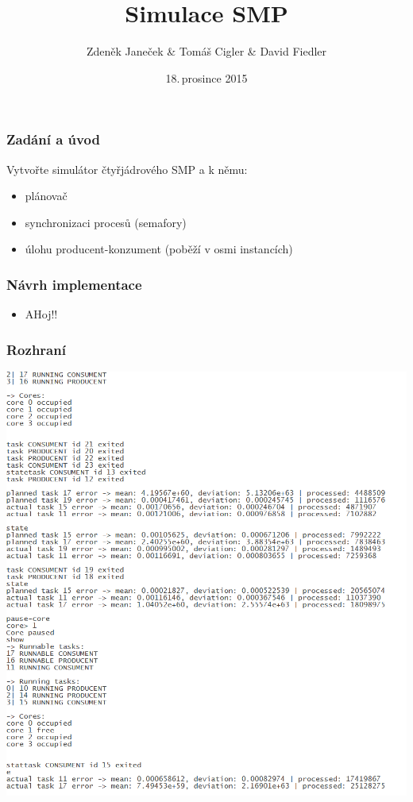 \documentclass{beamer}
\title{Simulace SMP}
\author{Zdeněk Janeček \& Tomáš Cigler \& David Fiedler}
\date{18.\,prosince 2015}
\begin{document}
\begin{frame} 
\titlepage
\end{frame}

\begin{frame} 
\frametitle{Zadání a úvod}
Vytvořte simulátor čtyřjádrového SMP a k němu:

\begin{itemize}
\item plánovač
\item synchronizaci procesů (semafory)
\item úlohu producent-konzument (poběží v osmi instancích)
\end{itemize}

\end{frame}


\begin{frame} 
\frametitle{Návrh implementace}

\begin{itemize}
\item AHoj!!
\end{itemize}


\end{frame}

\begin{frame} 
\frametitle{Rozhraní}

\end{frame}

\begin{frame} 
\includegraphics[height=\textheight]{obrazky/screen.png}

\end{frame}
\end{document}
